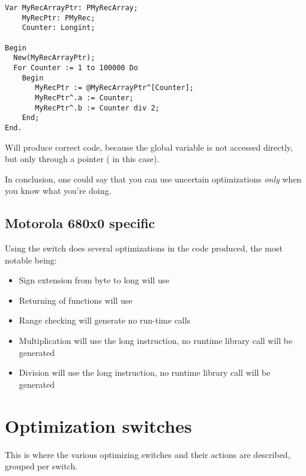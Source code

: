 {\begin{enumerate}
\begin{verbatim}
Var MyRecArrayPtr: PMyRecArray;
    MyRecPtr: PMyRec;
    Counter: Longint;

Begin
  New(MyRecArrayPtr);
  For Counter := 1 to 100000 Do
    Begin
       MyRecPtr := @MyRecArrayPtr^[Counter];
       MyRecPtr^.a := Counter;
       MyRecPtr^.b := Counter div 2;
    End;
End.
\end{verbatim}
Will produce correct code, because the global variable 
is not accessed directly, but only through a pointer ( in this
case).

In conclusion, one could say that you can use uncertain optimizations {\em
only} when you know what you're doing.
\end{enumerate}

\subsection{Motorola 680x0 specific}

Using the  switch does several optimizations in the
code produced, the most notable being:

\begin{itemize}
\item Sign extension from byte to long will use 
\item Returning of functions will use 
\item Range checking will generate no run-time calls
\item Multiplication will use the long  instruction, no
runtime library call will be generated
\item Division will use the long  instruction, no
runtime library call will be generated
\end{itemize}

\section{Optimization switches}
This is where the various optimizing switches and their actions are
described, grouped per switch.

}
